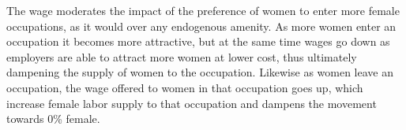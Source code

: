 \documentclass[11pt]{article}
\begin{document}
The wage moderates the impact of the preference of women to enter more female occupations, as it would over any endogenous amenity. As more women enter an occupation it becomes more attractive, but at the same time wages go down as employers are able to attract more women at lower cost, thus ultimately dampening the supply of women to the occupation. Likewise as women leave an occupation, the wage offered to women in that occupation goes up, which increase female labor supply to that occupation and dampens the movement towards 0\% female.







\end{document}
